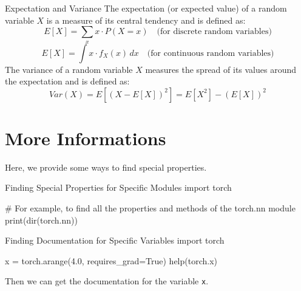 \begin{definition}{Expectation and Variance}
The expectation (or expected value) of a random variable \(X\) is a measure of its central tendency and is defined as:
\[
E[X] = \sum_{x} x \cdot P(X=x) \quad \text{(for discrete random variables)}
\]
\[E[X] = \int x \cdot f_X(x) \, dx \quad \text{(for continuous random variables)}\]
The variance of a random variable \(X\) measures the spread of its values around the expectation and is defined as:
\[Var(X) = E[(X - E[X])^2] = E[X^2] - (E[X])^2\]
\end{definition}

\section{More Informations}

Here, we provide some ways to find special properties.

\begin{pythoncode}{Finding Special Properties for Specific Modules}
import torch

# For example, to find all the properties and methods of the torch.nn module
print(dir(torch.nn))
\end{pythoncode}

\begin{pythoncode}{Finding Documentation for Specific Variables}
import torch

x = torch.arange(4.0, requires_grad=True)
help(torch.x)
\end{pythoncode}

Then we can get the documentation for the variable \texttt{x}.


